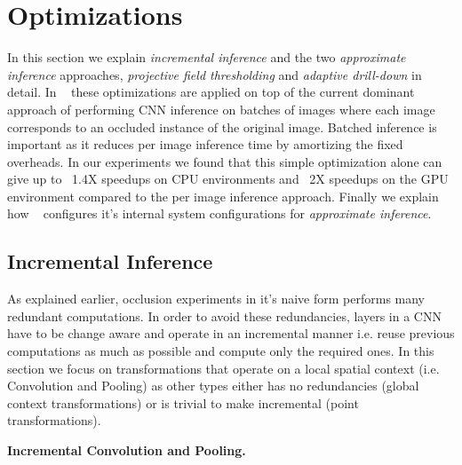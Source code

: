 \section{Optimizations}

In this section we explain \textit{incremental inference} and the two \textit{approximate inference} approaches, \textit{projective field thresholding} and \textit{adaptive drill-down} in detail.
In \system~ these optimizations are applied on top of the current dominant approach of performing CNN inference on batches of images where each image corresponds to an occluded instance of the original image.
Batched inference is important as it reduces per image inference time by amortizing the fixed overheads.
In our experiments we found that this simple optimization alone can give up to ~1.4X speedups on CPU environments and ~2X speedups on the GPU environment compared to the per image inference approach.
Finally we explain how \system~ configures it's internal system configurations for \textit{approximate inference}.

\subsection{Incremental Inference}\label{sec:inc_computation}

As explained earlier, occlusion experiments in it's naive form performs many redundant computations.
In order to avoid these redundancies, layers in a CNN have to be change aware and operate in an incremental manner i.e. reuse previous computations as much as possible and compute only the required ones.
In this section we focus on transformations that operate on a local spatial context (i.e. Convolution and Pooling) as other types either has no redundancies (global context transformations) or is trivial to make incremental (point transformations).

\vspace{2mm}
\noindent \textbf{Incremental Convolution and Pooling.}


